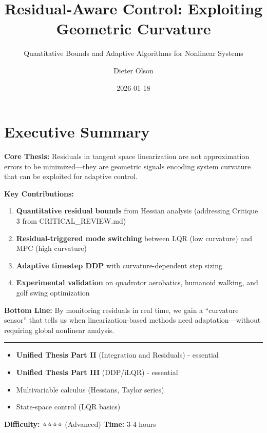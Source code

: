 \documentclass[
  letterpaper,
  DIV=11,
  numbers=noendperiod]{scrartcl}
\title{Residual-Aware Control: Exploiting Geometric Curvature}
\subtitle{Quantitative Bounds and Adaptive Algorithms for Nonlinear
Systems}
\author{Dieter Olson}
\date{2026-01-18}
\providecommand{\tightlist}{%
  \setlength{\itemsep}{0pt}\setlength{\parskip}{0pt}}\usepackage{longtable,booktabs,array}
\begin{document}
\maketitle


\section*{Executive Summary}\label{executive-summary}

\textbf{Core Thesis:} Residuals in tangent space linearization are not
approximation errors to be minimized---they are geometric signals
encoding system curvature that can be exploited for adaptive control.

\textbf{Key Contributions:}

\begin{enumerate}
\def\labelenumi{\arabic{enumi}.}
\tightlist
\item
  \textbf{Quantitative residual bounds} from Hessian analysis
  (addressing Critique 3 from CRITICAL\_REVIEW.md)
\item
  \textbf{Residual-triggered mode switching} between LQR (low curvature)
  and MPC (high curvature)
\item
  \textbf{Adaptive timestep DDP} with curvature-dependent step sizing
\item
  \textbf{Experimental validation} on quadrotor aerobatics, humanoid
  walking, and golf swing optimization
\end{enumerate}

\textbf{Bottom Line:} By monitoring residuals in real time, we gain a
``curvature sensor'' that tells us when linearization-based methods need
adaptation---without requiring global nonlinear analysis.

\begin{center}\rule{0.5\linewidth}{0.5pt}\end{center}

\begin{tcolorbox}[enhanced jigsaw, breakable, bottomtitle=1mm, title=\textcolor{quarto-callout-note-color}{\faInfo}\hspace{0.5em}{Prerequisites}, opacityback=0, left=2mm, titlerule=0mm, colframe=quarto-callout-note-color-frame, opacitybacktitle=0.6, bottomrule=.15mm, toptitle=1mm, toprule=.15mm, arc=.35mm, leftrule=.75mm, rightrule=.15mm, colback=white, colbacktitle=quarto-callout-note-color!10!white, coltitle=black]

\begin{itemize}
\tightlist
\item
  \textbf{Unified Thesis Part II} (Integration and Residuals) -
  essential
\item
  \textbf{Unified Thesis Part III} (DDP/iLQR) - essential
\item
  Multivariable calculus (Hessians, Taylor series)
\item
  State-space control (LQR basics)
\end{itemize}

\textbf{Difficulty:} ⭐⭐⭐⭐ (Advanced) \textbf{Time:} 3-4 hours

\end{tcolorbox}
\end{document}
